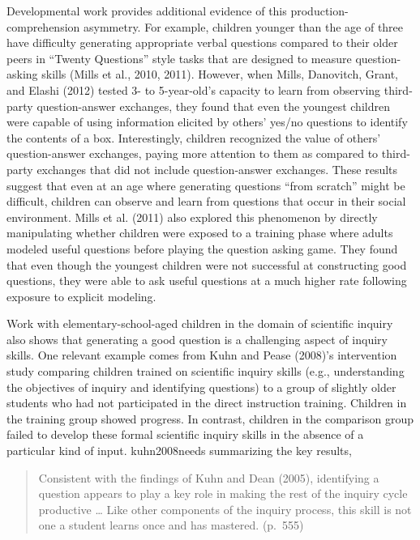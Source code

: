 \documentclass[english,floatsintext,man]{apa6}
\theoremstyle{definition}
\theoremstyle{definition}
\theoremstyle{definition}
\theoremstyle{remark}
\begin{document}
Developmental work provides additional evidence of this
production-comprehension asymmetry. For example, children younger than
the age of three have difficulty generating appropriate verbal questions
compared to their older peers in \enquote{Twenty Questions} style tasks
that are designed to measure question-asking skills (Mills et al., 2010,
2011). However, when Mills, Danovitch, Grant, and Elashi (2012) tested
3- to 5-year-old's capacity to learn from observing third-party
question-answer exchanges, they found that even the youngest children
were capable of using information elicited by others' yes/no questions
to identify the contents of a box. Interestingly, children recognized
the value of others' question-answer exchanges, paying more attention to
them as compared to third-party exchanges that did not include
question-answer exchanges. These results suggest that even at an age
where generating questions \enquote{from scratch} might be difficult,
children can observe and learn from questions that occur in their social
environment. Mills et al. (2011) also explored this phenomenon by
directly manipulating whether children were exposed to a training phase
where adults modeled useful questions before playing the question asking
game. They found that even though the youngest children were not
successful at constructing good questions, they were able to ask useful
questions at a much higher rate following exposure to explicit modeling.

Work with elementary-school-aged children in the domain of scientific
inquiry also shows that generating a good question is a challenging
aspect of inquiry skills. One relevant example comes from Kuhn and Pease
(2008)'s intervention study comparing children trained on scientific
inquiry skills (e.g., understanding the objectives of inquiry and
identifying questions) to a group of slightly older students who had not
participated in the direct instruction training. Children in the
training group showed progress. In contrast, children in the comparison
group failed to develop these formal scientific inquiry skills in the
absence of a particular kind of input. kuhn2008needs summarizing the key
results,

\begin{quote}
Consistent with the findings of Kuhn and Dean (2005), identifying a
question appears to play a key role in making the rest of the inquiry
cycle productive \ldots{} Like other components of the inquiry process,
this skill is not one a student learns once and has mastered. (p.~555)
\end{quote}
\end{document}
